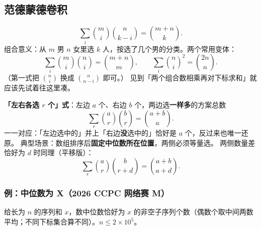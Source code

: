 
		\subsection{范德蒙德卷积}

		\[
			\sum_{i}\binom{m}{i}\binom{n}{k-i} = \binom{m+n}{k}.
		\]
		组合意义：从 $m$ 男 $n$ 女里选 $k$ 人，按选了几个男的分类。两个常用变体：
		\[
			\sum_{i}\binom{m}{i}\binom{n}{i} = \binom{m+n}{m},
			\qquad
			\sum_{i}\binom{n}{i}^{2} = \binom{2n}{n}.
		\]
		（第一式把 $\binom{n}{i}$ 换成 $\binom{n}{n-i}$ 即可。）
		见到「两个组合数相乘再对下标求和」就应该先试着往这里凑。

		\textbf{「左右各选 $r$ 个」式}：左边 $a$ 个、右边 $b$ 个，两边选\textbf{一样多}的方案总数
		\[
			\sum_{r}\binom{a}{r}\binom{b}{r} = \binom{a+b}{a}.
		\]
		一一对应：「左边选中的」并上「右边\textbf{没}选中的」恰好是 $a$ 个，反过来也唯一还原。
		典型场景：数组排序后\textbf{固定中位数所在位置}，两侧必须等量选。
		两侧数量差恰好为 $d$ 时同理（平移版）：
		\[
			\sum_{r}\binom{a}{r}\binom{b}{r+d} = \binom{a+b}{a+d}.
		\]

		\subsubsection{例：中位数为 X（2026 CCPC 网络赛 M）}

		给长为 $n$ 的序列和 $x$，数中位数恰好为 $x$ 的非空子序列个数（偶数个取中间两数平均；不同下标集合算不同）。$n\le 2\times10^5$。


